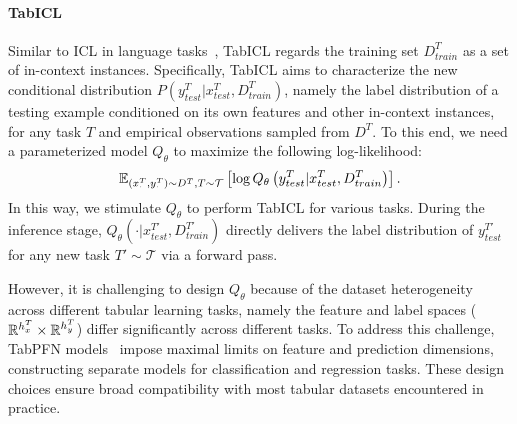 \paragraph{TabICL}
Similar to ICL in language tasks~\citep{Brown2020GPT-3}, TabICL regards the training set $D^T_{train}$ as a set of in-context instances.
Specifically, TabICL aims to characterize the new conditional distribution $P(y^T_{test} | x^T_{test}, D^T_{train})$, namely the label distribution of a testing example conditioned on its own features and other in-context instances, for any task $T$ and empirical observations sampled from $D^T$.
To this end, we need a parameterized model $Q_\theta$ to maximize the following log-likelihood:
\begin{align}
    \mathbb{E}_{ (x^T_{\cdot}, y^T_{\cdot}) \sim D^T, T \sim \mathcal{T} } \left[ \log Q_\theta \left( y^T_{test} | x^T_{test}, D^T_{train} \right) \right].
    \label{eq:TabICL}
\end{align}
In this way, we stimulate $Q_\theta$ to perform TabICL for various tasks.
During the inference stage, $Q_\theta(\cdot | x^{T'}_{test}, D^{T'}_{train})$ directly delivers the label distribution of $y^{T'}_{test}$ for any new task $T' \sim \mathcal{T}$ via a forward pass.

However, it is challenging to design $Q_\theta$ because of the dataset heterogeneity across different tabular learning tasks, namely the feature and label spaces ($\mathbb{R}^{h_x^T} \times \mathbb{R}^{h_y^T}$) differ significantly across different tasks.
To address this challenge, TabPFN models~\citep{hollmann2023TabPFN,hollmann2025TabPFNv2} impose maximal limits on feature and prediction dimensions, constructing separate models for classification and regression tasks.
These design choices ensure broad compatibility with most tabular datasets encountered in practice.

